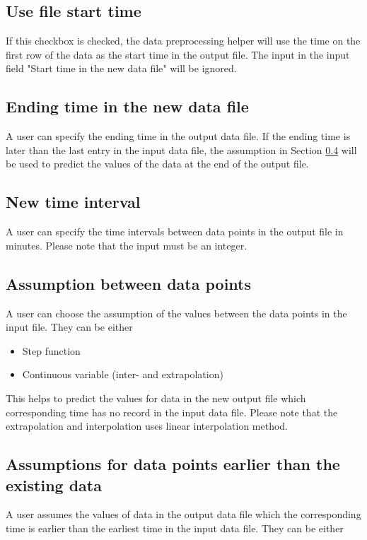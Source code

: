 \documentclass[12pt,a4paper]{article}
\begin{document}
\subsection{Use file start time}
If this checkbox is checked, the data preprocessing helper will use the time on the first row of the data as the start time in the output file.
The input in the input field "Start time in the new data file" will be ignored.

\subsection{Ending time in the new data file}
A user can specify the ending time in the output data file.
If the ending time is later than the last entry in the input data file, the assumption in Section \ref{subsec:assume_bet_dat} will be used to predict the values of the data at the end of the output file.

\subsection{New time interval}
A user can specify the time intervals between data points in the output file in minutes.
Please note that the input must be an integer.

\subsection{Assumption between data points}
\label{subsec:assume_bet_dat}
A user can choose the assumption of the values between the data points in the input file.
They can be either

\begin{itemize}
\item Step function
\item Continuous variable (inter- and extrapolation)
\end{itemize}

This helps to predict the values for data in the new output file which corresponding time has no record in the input data file.
Please note that the extrapolation and interpolation uses linear interpolation method.

\subsection{Assumptions for data points earlier than the existing data}
\label{subsec:early_dat}
A user assumes the values of data in the output data file which the corresponding time is earlier than the earliest time in the input data file. They can be either
\end{document}
